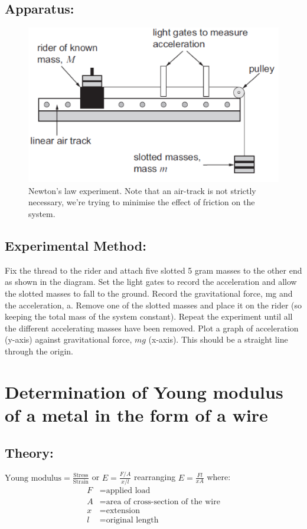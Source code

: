 \subsection{Apparatus:}    
\begin{figure}
\includegraphics[width=\textwidth]{fma.PNG}
\caption{Newton's law experiment. Note that an air-track is not strictly necessary, we're trying to minimise the effect of friction on the system.}
\end{figure}
   
\subsection{Experimental Method:}  
Fix the thread to the rider and attach five slotted 5 gram masses to the other end as shown in the diagram. Set the light gates to record the acceleration and allow the slotted masses to fall to the ground. Record the gravitational force, mg and the acceleration, a. Remove one of the slotted masses and place it on the rider (so keeping the total mass of the system constant).   
Repeat the experiment until all the different accelerating masses have been removed. Plot a graph of acceleration (y-axis) against gravitational force, $mg$ (x-axis). This should be a straight line through the origin. 

\section{Determination of Young modulus of a metal in the form of a wire}

\subsection{Theory:}  $\text{Young modulus}  =\frac{\text{Stress}}{\text{Strain}}$  or $ E  =\frac{F/A}{x/l}$  rearranging $E =\frac{Fl}{xA}$ 
where: 
\begin{align}
       F &= \text{applied load} \\       A &= \text{area of cross-section of the wire} \\       x &= \text{extension}  \\      l &= \text{original length} \\ 
\end{align}
       
